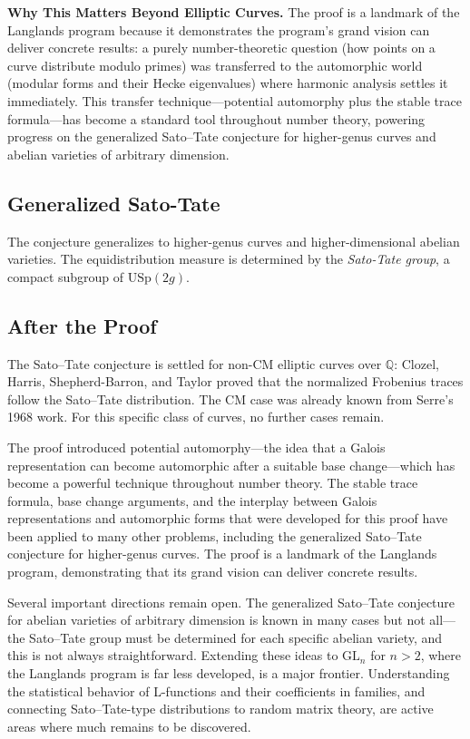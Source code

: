 \textbf{Why This Matters Beyond Elliptic Curves.} The proof is a landmark of the Langlands program because it demonstrates the program's grand vision can deliver concrete results: a purely number-theoretic question (how points on a curve distribute modulo primes) was transferred to the automorphic world (modular forms and their Hecke eigenvalues) where harmonic analysis settles it immediately. This transfer technique---potential automorphy plus the stable trace formula---has become a standard tool throughout number theory, powering progress on the generalized Sato--Tate conjecture for higher-genus curves and abelian varieties of arbitrary dimension.

\subsection{Generalized Sato-Tate}
The conjecture generalizes to higher-genus curves and higher-dimensional abelian varieties. The equidistribution measure is determined by the \emph{Sato-Tate group}, a compact subgroup of $\text{USp}(2g)$.

\subsection{After the Proof}

The Sato--Tate conjecture is settled for non-CM elliptic curves over $\mathbb{Q}$: Clozel, Harris, Shepherd-Barron, and Taylor proved that the normalized Frobenius traces follow the Sato--Tate distribution. The CM case was already known from Serre's 1968 work. For this specific class of curves, no further cases remain.

The proof introduced potential automorphy---the idea that a Galois representation can become automorphic after a suitable base change---which has become a powerful technique throughout number theory. The stable trace formula, base change arguments, and the interplay between Galois representations and automorphic forms that were developed for this proof have been applied to many other problems, including the generalized Sato--Tate conjecture for higher-genus curves. The proof is a landmark of the Langlands program, demonstrating that its grand vision can deliver concrete results.

Several important directions remain open. The generalized Sato--Tate conjecture for abelian varieties of arbitrary dimension is known in many cases but not all---the Sato--Tate group must be determined for each specific abelian variety, and this is not always straightforward. Extending these ideas to $\text{GL}_n$ for $n > 2$, where the Langlands program is far less developed, is a major frontier. Understanding the statistical behavior of L-functions and their coefficients in families, and connecting Sato--Tate-type distributions to random matrix theory, are active areas where much remains to be discovered.

